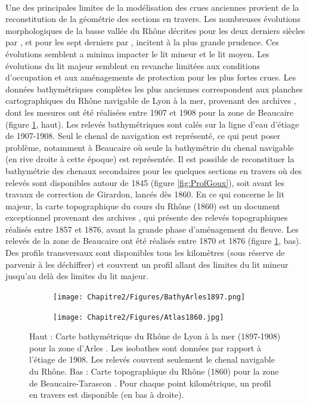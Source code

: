 	\paragraph{} Une des principales limites de la modélisation des crues anciennes provient de la reconstitution de la géométrie des sections en travers. Les nombreuses évolutions morphologiques de la basse vallée du Rhône décrites pour les deux derniers siècles par \citet{raccasi_mutations_2008}, et pour les sept derniers	par \citet{pichard_sept_2014}, incitent à la plus grande prudence. Ces évolutions semblent a minima impacter le lit mineur et le lit moyen. Les évolutions du lit majeur semblent en revanche limitées aux conditions d'occupation et aux aménagements de protection pour les plus fortes crues. Les données bathymétriques complètes les plus anciennes correspondent aux planches cartographiques du Rhône navigable de Lyon à la mer, provenant des archives \citet{cnr_cartes_1908}, dont les mesures ont été réalisées entre 1907 et 1908 pour la zone de Beaucaire (figure \ref{fig:BathyTopo}, haut). Les relevés bathymétriques sont calés sur la ligne d'eau d'étiage de 1907-1908. Seul le chenal de navigation est représenté, ce qui peut poser problème, notamment à Beaucaire où seule la bathymétrie du chenal navigable (en rive droite à cette époque) est représentée. Il est possible de reconstituer la bathymétrie des chenaux secondaires pour les quelques sections en travers où des relevés sont disponibles autour de 1845 (figure \ref{fig:ProfGoux}), soit avant les travaux de correction de Girardon, lancés dès 1860. En ce qui concerne le lit majeur, la carte topographique du cours du Rhône (1860) est un document exceptionnel provenant des archives \citet{cnr_carte_1876}, qui présente des relevés topographiques réalisés entre 1857 et 1876, avant la grande phase d'aménagement du fleuve. Les relevés de la zone de Beaucaire ont été réalisés entre 1870 et 1876 (figure \ref{fig:BathyTopo}, bas). Des profils transversaux sont disponibles tous les kilomètres (sous réserve de parvenir à les déchiffrer) et couvrent un profil allant des limites du lit mineur jusqu'au delà des limites du lit majeur.
		
	\begin{figure}[h]
		\centering
		\begin{subfigure}{.6\linewidth}
			\texttt{[image: Chapitre2/Figures/BathyArles1897.png]}
		\end{subfigure}
		
		\vspace{7pt}
		
		\begin{subfigure}{0.5\linewidth}
			\texttt{[image: Chapitre2/Figures/Atlas1860.jpg]}
		\end{subfigure}
		\caption{Haut : Carte bathymétrique du Rhône de Lyon à la mer (1897-1908) pour la zone d'Arles \citep{cnr_cartes_1908}. Les isobathes sont données par rapport à l'étiage de 1908. Les relevés couvrent seulement le chenal navigable du Rhône. Bas : Carte topographique du Rhône (1860) pour la zone de Beaucaire-Tarascon \citep{cnr_carte_1876}. Pour chaque point kilométrique, un profil en travers est disponible (en bas à droite).}
		\label{fig:BathyTopo}
	\end{figure}
	
